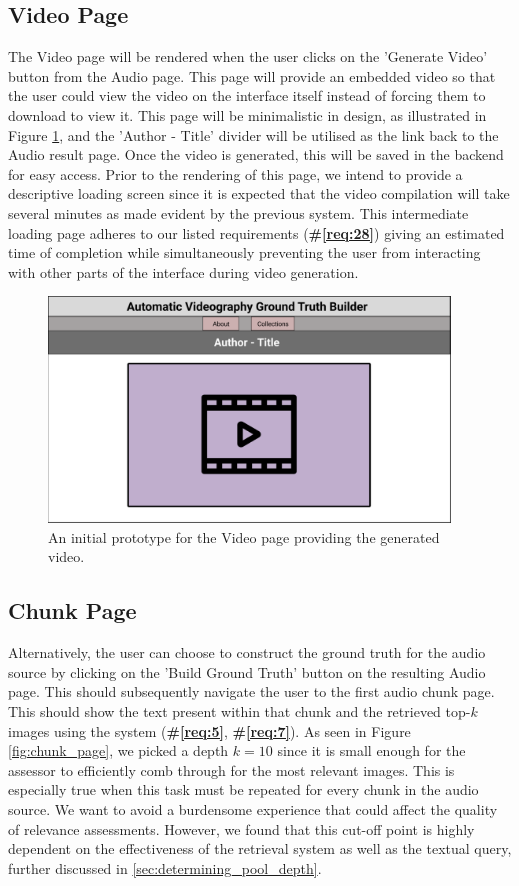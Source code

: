 \documentclass{l4proj}
\begin{document}
\subsection{Video Page}
The Video page will be rendered when the user clicks on the 'Generate Video' button from the Audio page. This page will provide an embedded video so that the user could view the video on the interface itself instead of forcing them to download to view it. This page will be minimalistic in design, as illustrated in Figure \ref{fig:video_page}, and the 'Author - Title' divider will be utilised as the link back to the Audio result page. Once the video is generated, this will be saved in the backend for easy access. Prior to the rendering of this page, we intend to provide a descriptive loading screen since it is expected that the video compilation will take several minutes as made evident by the previous system. This intermediate loading page adheres to our listed requirements (\textbf{\#\ref{req:28}}) giving an estimated time of completion while simultaneously preventing the user from interacting with other parts of the interface during video generation.

\begin{figure}
    \centering
    \includegraphics[width=0.95\textwidth]{figures/video_page.pdf}
    \caption{An initial prototype for the Video page providing the generated video.}
    \label{fig:video_page}
\end{figure}

\subsection{Chunk Page}
Alternatively, the user can choose to construct the ground truth for the audio source by clicking on the 'Build Ground Truth' button on the resulting Audio page. This should subsequently navigate the user to the first audio chunk page. This should show the text present within that chunk and the retrieved top-$k$ images using the system (\textbf{\#\ref{req:5}}, \textbf{\#\ref{req:7}}). As seen in Figure \ref{fig:chunk_page}, we picked a depth $k=10$ since it is small enough for the assessor to efficiently comb through for the most relevant images. This is especially true when this task must be repeated for every chunk in the audio source. We want to avoid a burdensome experience that could affect the quality of relevance assessments. However, we found that this cut-off point is highly dependent on the effectiveness of the retrieval system as well as the textual query, further discussed in \ref{sec:determining_pool_depth}.
\end{document}
